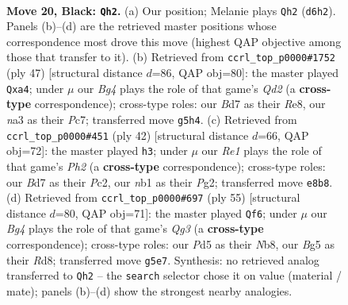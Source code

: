 \documentclass[11pt]{article}
\begin{document}
\clearpage

\begin{figure}[p]\centering
\begin{subfigure}{0.46\textwidth}\centering
\resizebox{\linewidth}{!}{%
\newchessgame
\chessboard[
  setfen={r3r3/1ppb1pkp/2nq4/p2p2b1/3P2P1/NP2P3/P4P2/RNBQRK2 b - - 4 20},
  showmover=false,
  pgfstyle=straightmove, color=movearrow, markmove={d6-h2}
]}
\caption{}
\end{subfigure}\hfill
\begin{subfigure}{0.46\textwidth}\centering
\resizebox{\linewidth}{!}{%
\newchessgame
\chessboard[
  setfen={1r2r1k1/2pq1pp1/b4b1p/B2Pn3/P1P1B2P/6P1/2R1QP1N/3R2K1 b - - 0 24},
  showmover=false,
  pgfstyle=straightmove, color=movearrow, markmove={d7-a4}
]}
\caption{}
\end{subfigure}
\\[4pt]
\begin{subfigure}{0.46\textwidth}\centering
\resizebox{\linewidth}{!}{%
\newchessgame
\chessboard[
  setfen={3rnrk1/4qp1p/p1bp2p1/1p6/4PQB1/P1NR4/1PP3PP/5R1K w - - 3 22},
  showmover=false,
  pgfstyle=straightmove, color=movearrow, markmove={h2-h3}
]}
\caption{}
\end{subfigure}\hfill
\begin{subfigure}{0.46\textwidth}\centering
\resizebox{\linewidth}{!}{%
\newchessgame
\chessboard[
  setfen={1n1r2k1/2p1brp1/pp4qp/3Pp3/4P3/PN1R1BNb/1PQ2P1P/4R2K b - - 0 28},
  showmover=false,
  pgfstyle=straightmove, color=movearrow, markmove={g6-f6}
]}
\caption{}
\end{subfigure}
\caption{\textbf{Move 20, Black: \texttt{Qh2}.} (a) Our position; Melanie plays \texttt{Qh2} (\texttt{d6h2}). Panels (b)--(d) are the retrieved master positions whose correspondence most drove this move (highest QAP objective among those that transfer to it). (b) Retrieved from \texttt{ccrl\_top\_p0000\#1752} (ply 47) [structural distance $d$=86, QAP obj=80]: the master played \texttt{Qxa4}; under $\mu$ our \emph{Bg4} plays the role of that game's \emph{Qd2} (a \textbf{cross-type} correspondence); cross-type roles: our \emph{B}d7 as their \emph{R}e8, our \emph{n}a3 as their \emph{P}c7; transferred move \texttt{g5h4}. (c) Retrieved from \texttt{ccrl\_top\_p0000\#451} (ply 42) [structural distance $d$=66, QAP obj=72]: the master played \texttt{h3}; under $\mu$ our \emph{Re1} plays the role of that game's \emph{Ph2} (a \textbf{cross-type} correspondence); cross-type roles: our \emph{B}d7 as their \emph{P}c2, our \emph{n}b1 as their \emph{P}g2; transferred move \texttt{e8b8}. (d) Retrieved from \texttt{ccrl\_top\_p0000\#697} (ply 55) [structural distance $d$=80, QAP obj=71]: the master played \texttt{Qf6}; under $\mu$ our \emph{Bg4} plays the role of that game's \emph{Qg3} (a \textbf{cross-type} correspondence); cross-type roles: our \emph{P}d5 as their \emph{N}b8, our \emph{B}g5 as their \emph{R}d8; transferred move \texttt{g5e7}. Synthesis: no retrieved analog transferred to \texttt{Qh2} -- the \texttt{search} selector chose it on value (material / mate); panels (b)--(d) show the strongest nearby analogies.}
\label{fig:thought-m39}
\end{figure}
\end{document}
